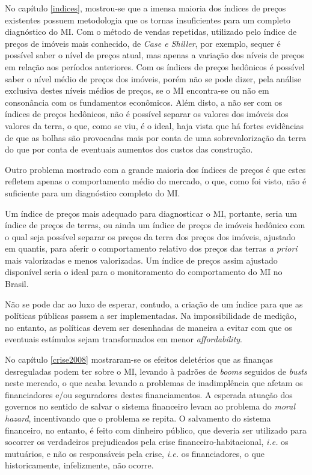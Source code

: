 \documentclass[
	12pt,				%
	oneside,			%
	a4paper,			%
	chapter=TITLE,		%
	section=TITLE,		%
	english,			%
	brazil				%
	]{abntex2}
\begin{document}
\begin{refsection}
No capítulo \ref{indices}, mostrou-se que a imensa maioria dos índices de
preços existentes possuem metodologia que os tornas insuficientes para um
completo diagnóstico do \gls{MI}. Com o método de vendas repetidas,
utilizado pelo índice de preços de imóveis mais conhecido, de \emph{Case e Shiller},
por exemplo, sequer é possível saber o nível de preços atual, mas apenas a
variação dos níveis de preços em relação aos períodos anteriores. Com os índices
de preços hedônicos é possível saber o nível médio de preços dos imóveis,
porém não se pode dizer, pela análise exclusiva destes níveis médios de preços,
se o \gls{MI} encontra-se ou não em consonância com os fundamentos econômicos.
Além disto, a não ser com os índices de preços hedônicos, não é possível separar
os valores dos imóveis dos valores da terra, o que, como se viu, é o ideal, haja
vista que há fortes evidências de que as bolhas são provocadas mais por conta de
uma sobrevalorização da terra do que por conta de eventuais aumentos dos custos
das construção.

Outro problema mostrado com a grande maioria dos índices de preços é que estes
refletem apenas o comportamento médio do mercado, o que, como foi visto, não
é suficiente para um diagnóstico completo do \gls{MI}.

Um índice de preços mais adequado para diagnosticar o \gls{MI}, portante, seria
um índice de preços de terras, ou ainda um índice de preços de imóveis hedônico
com o qual seja possível separar os preços da terra dos preços dos imóveis,
ajustado em quantis, para aferir o comportamento relativo dos preços das terras
\emph{a priori} mais valorizadas e menos valorizadas. Um índice de preços assim
ajustado disponível seria o ideal para o monitoramento do comportamento do
\gls{MI} no Brasil.

Não se pode dar ao luxo de esperar, contudo, a criação de um índice para que
as políticas públicas passem a ser implementadas. Na impossibilidade de medição,
no entanto, as políticas devem ser desenhadas de maneira a evitar com que os
eventuais estímulos sejam transformados em menor \emph{affordability}.

No capítulo \ref{crise2008} mostraram-se os efeitos deletérios que as finanças
desreguladas podem ter sobre o \gls{MI}, levando à padrões de \emph{booms} seguidos
de \emph{busts} neste mercado, o que acaba levando a problemas de inadimplência que
afetam os financiadores e/ou seguradores destes financiamentos. A esperada
atuação dos governos no sentido de salvar o sistema financeiro levam ao problema
do \emph{moral hazard}, incentivando que o problema se repita. O salvamento do
sistema financeiro, no entanto, é feito com dinheiro público, que deveria ser
utilizado para socorrer os verdadeiros prejudicados pela crise
financeiro-habitacional, \emph{i.e.} os mutuários, e não os responsáveis pela crise,
\emph{i.e.} os financiadores, o que historicamente, infelizmente, não ocorre.


\end{refsection}
\end{document}

